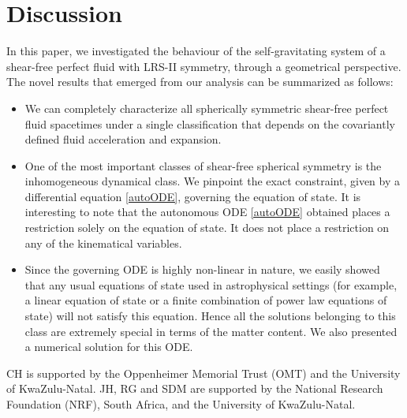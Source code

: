 \documentclass[abstract=on,notitlepage,superscriptaddress,nofootinbib,aps,preprint,prd]{revtex4}
\newcommand{\0}{^{(0)}}
\newcommand{\1}{^{(1)}}
\newcommand{\2}{^{(2)}}
\newcommand{\3}{{}^{(3)}}
\begin{document}


\section{Discussion}
In this paper, we investigated the behaviour of the self-gravitating system of a shear-free perfect fluid with LRS-II symmetry, through a geometrical perspective. The novel results that emerged from our analysis can be summarized as follows:
\begin{itemize}
\item We can completely characterize all spherically symmetric shear-free perfect fluid spacetimes under a single classification that depends on the covariantly defined fluid acceleration and expansion.
\item One of the most important classes of shear-free spherical symmetry is the inhomogeneous dynamical class. We  pinpoint the exact constraint, given by a differential equation \eqref{autoODE}, governing the equation of state. It is interesting to note that the autonomous ODE \eqref{autoODE} obtained places a restriction solely on the equation of state. It does not place a restriction on any of the kinematical variables.  
\item Since the governing ODE is highly non-linear in nature, we easily showed that any usual equations of state used in astrophysical settings (for example, a linear equation of state or a finite combination of power law equations of state) will not satisfy this equation. Hence all the solutions belonging to this class are extremely special in terms of the matter content. We also presented a numerical solution for this ODE.
\end{itemize}





\begin{acknowledgements} 
CH is supported by the Oppenheimer Memorial Trust (OMT) and the University of KwaZulu-Natal. JH, RG and SDM are supported by the National Research Foundation (NRF), South Africa, and the University of KwaZulu-Natal. 
\end{acknowledgements}
\end{document}
